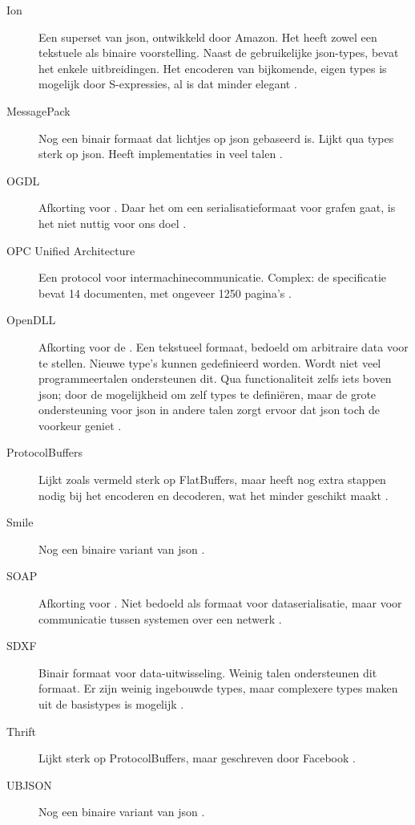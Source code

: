 \begin{description}
    \item[Ion] Een superset van json, ontwikkeld door Amazon.
    Het heeft zowel een tekstuele als binaire voorstelling.
    Naast de gebruikelijke json-types, bevat het enkele uitbreidingen.
    Het encoderen van bijkomende, eigen types is mogelijk door S-expressies, al is dat minder elegant \autocite{ion}.
    \item[MessagePack] Nog een binair formaat dat lichtjes op json gebaseerd is.
    Lijkt qua types sterk op json.
    Heeft implementaties in veel talen \autocite{messagepack}.
    \item[OGDL] Afkorting voor .
    Daar het om een serialisatieformaat voor grafen gaat, is het niet nuttig voor ons doel \autocite{ogdl}.
    \item[OPC Unified Architecture] Een protocol voor intermachinecommunicatie.
    Complex: de specificatie bevat 14 documenten, met ongeveer 1250 pagina's \autocite{tr62541}.
    \item[OpenDLL] Afkorting voor de .
    Een tekstueel formaat, bedoeld om arbitraire data voor te stellen.
    Nieuwe type's kunnen gedefinieerd worden.
    Wordt niet veel programmeertalen ondersteunen dit.
    Qua functionaliteit zelfs iets boven json;
    door de mogelijkheid om zelf types te definiëren, maar de grote ondersteuning voor json in andere talen zorgt ervoor dat json toch de voorkeur geniet \autocite{openddl}.
    \item[ProtocolBuffers] Lijkt zoals vermeld sterk op FlatBuffers, maar heeft nog extra stappen nodig bij het encoderen en decoderen, wat het minder geschikt maakt \autocite{protobuf}.
    \item[Smile] Nog een binaire variant van json \autocite{smile}.
    \item[SOAP] Afkorting voor .
    Niet bedoeld als formaat voor dataserialisatie, maar voor communicatie tussen systemen over een netwerk \autocite{soap}.
    \item[SDXF] Binair formaat voor data-uitwisseling.
    Weinig talen ondersteunen dit formaat.
    Er zijn weinig ingebouwde types, maar complexere types maken uit de basistypes is mogelijk \autocite{rfc3072}.
    \item[Thrift] Lijkt sterk op ProtocolBuffers, maar geschreven door Facebook \autocite{slee2007}.
    \item[UBJSON] Nog een binaire variant van json \autocite{ubjson}.

\end{description}

